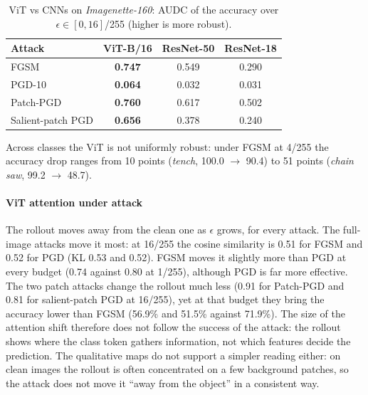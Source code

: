 \documentclass{article}
\begin{document}
\begin{table}[H]
  \caption{ViT vs CNNs on \textit{Imagenette-160}: AUDC of the accuracy over $\epsilon\in[0,16]$/255 (higher is more robust).}
  \label{tab:audc}
  \centering
  \begin{small}
    \begin{tabular}{lccc}
      \toprule
      Attack & ViT-B/16 & ResNet-50 & ResNet-18 \\
      \midrule
      FGSM              & \textbf{0.747} & 0.549 & 0.290 \\
      PGD-10            & \textbf{0.064} & 0.032 & 0.031 \\
      Patch-PGD         & \textbf{0.760} & 0.617 & 0.502 \\
      Salient-patch PGD & \textbf{0.656} & 0.378 & 0.240 \\
      \bottomrule
    \end{tabular}
  \end{small}
  \vspace{-0.3cm}
\end{table}

Across classes the ViT is not uniformly robust: under FGSM at 4/255 the accuracy drop ranges from 10 points (\textit{tench}, 100.0 $\rightarrow$ 90.4) to 51 points (\textit{chain saw}, 99.2 $\rightarrow$ 48.7).

\paragraph{ViT attention under attack}
The rollout moves away from the clean one as $\epsilon$ grows, for every attack. The full-image attacks move it most: at 16/255 the cosine similarity is 0.51 for FGSM and 0.52 for PGD (KL 0.53 and 0.52). FGSM moves it slightly more than PGD at every budget (0.74 against 0.80 at 1/255), although PGD is far more effective. The two patch attacks change the rollout much less (0.91 for Patch-PGD and 0.81 for salient-patch PGD at 16/255), yet at that budget they bring the accuracy lower than FGSM (56.9\% and 51.5\% against 71.9\%). The size of the attention shift therefore does not follow the success of the attack: the rollout shows where the class token gathers information, not which features decide the prediction. The qualitative maps do not support a simpler reading either: on clean images the rollout is often concentrated on a few background patches, so the attack does not move it ``away from the object'' in a consistent way.
\end{document}
